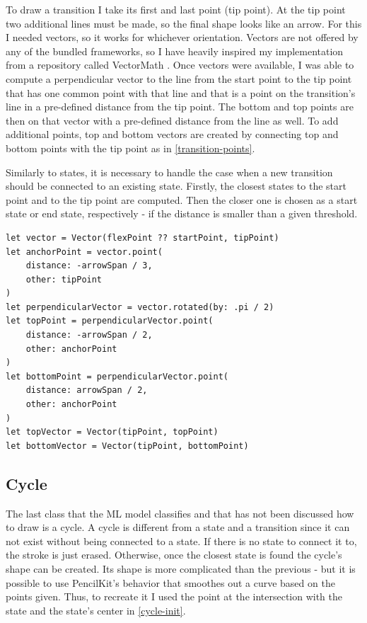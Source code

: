To draw a transition I take its first and last point (tip point). At the tip point two additional lines must be made, so the final shape looks like an arrow. For this I needed vectors, so it works for whichever orientation. Vectors are not offered by any of the bundled frameworks, so I have heavily inspired my implementation from a repository called VectorMath \cite{vectormath}. Once vectors were available, I was able to compute a perpendicular vector to the line from the start point to the tip point that has one common point with that line and that is a point on the transition's line in a pre-defined distance from the tip point. The bottom and top points are then on that vector with a pre-defined distance from the line as well. To add additional points, top and bottom vectors are created by connecting top and bottom points with the tip point as in \ref{transition-points}.

Similarly to states, it is necessary to handle the case when a new transition should be connected to an existing state. Firstly, the closest states to the start point and to the tip point are computed. Then the closer one is chosen as a start state or end state, respectively - if the distance is smaller than a given threshold.

\begin{lstlisting}[caption={Computation of top and bottom points, vectors}, label=transition-points]
let vector = Vector(flexPoint ?? startPoint, tipPoint)
let anchorPoint = vector.point(
    distance: -arrowSpan / 3, 
    other: tipPoint
)
let perpendicularVector = vector.rotated(by: .pi / 2)
let topPoint = perpendicularVector.point(
    distance: -arrowSpan / 2,
    other: anchorPoint
)
let bottomPoint = perpendicularVector.point(
    distance: arrowSpan / 2,
    other: anchorPoint
)
let topVector = Vector(tipPoint, topPoint)
let bottomVector = Vector(tipPoint, bottomPoint)
\end{lstlisting}

\subsection{Cycle}

The last class that the ML model classifies and that has not been discussed how to draw is a cycle. A cycle is different from a state and a transition since it can not exist without being connected to a state. If there is no state to connect it to, the stroke is just erased. Otherwise, once the closest state is found the cycle's shape can be created. Its shape is more complicated than the previous - but it is possible to use PencilKit's behavior that smoothes out a curve based on the points given. Thus, to recreate it I used the point at the intersection with the state and the state's center in \ref{cycle-init}.

